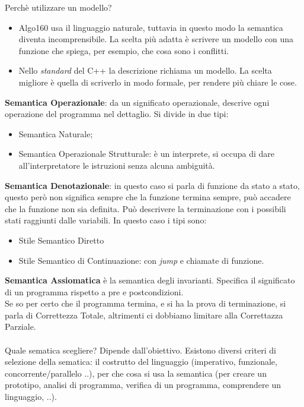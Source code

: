 \documentclass[10pt,                    %
               a4paper,                 %
               twoside,                 %
               openright,               %
               english,                 
               italian,                 
               ]{book}
\begin{document}
Perch\`e utilizzare un modello?
\begin{itemize}
\item Algo160 usa il linguaggio naturale, tuttavia in questo modo la semantica diventa incomprensibile. La scelta pi\`u adatta \`e scrivere un modello con una funzione che spiega, per esempio, che cosa sono i conflitti.
\item Nello \textit{standard} del C++ la descrizione richiama un modello. La scelta migliore \`e quella di scriverlo in modo formale, per rendere pi\`u chiare le cose.
\end{itemize}
\noindent
\textbf{Semantica Operazionale}: da un significato operazionale, descrive ogni operazione del programma nel dettaglio. Si divide in due tipi:
\begin{itemize}
\item Semantica Naturale;
\item Semantica Operazionale Strutturale: \`e un interprete, si occupa di dare all'interpretatore le istruzioni senza alcuna ambiguit\`a.
\end{itemize}
\noindent
\textbf{Semantica Denotazionale}: in questo caso si parla di funzione da stato a stato, questo per\`o non significa sempre che la funzione termina sempre, pu\`o accadere che la funzione non sia definita.  Pu\`o descrivere la terminazione con i possibili stati raggiunti dalle variabili. In questo caso i tipi sono:
\begin{itemize}
\item Stile Semantico Diretto
\item Stile Semantico di Continuazione: con \textit{jump} e chiamate di funzione.
\end{itemize}
\noindent
\textbf{Semantica Assiomatica} \`e la semantica degli invarianti. Specifica il significato di un programma rispetto a pre e postcondizioni.\\
Se so per certo che il programma termina, e si ha la prova di terminazione, si parla di Correttezza Totale, altrimenti ci dobbiamo limitare alla Correttazza Parziale. \\\\
\noindent
Quale sematica scegliere? Dipende dall'obiettivo.
Esistono diversi criteri di selezione della sematica: il costrutto del linguaggio (imperativo, funzionale, concorrente/parallelo ..), per che cosa si usa la semantica (per creare un prototipo, analisi di programma, verifica di un programma, comprendere un linguaggio, ..).
\\\\
\end{document}
